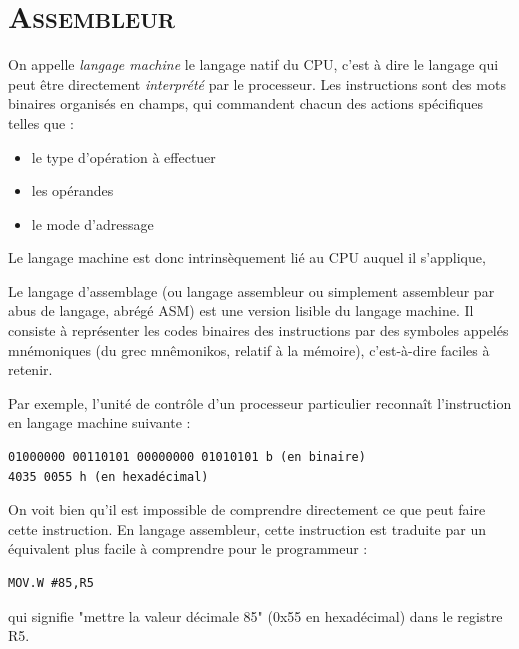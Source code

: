 \chapter{\textsc{Assembleur}}

On appelle \textit{langage machine} le langage natif du CPU, c'est à dire le langage qui peut être directement \textit{interprété} par le processeur. Les instructions sont des mots binaires organisés en champs, qui commandent chacun des actions spécifiques telles que :
\begin{itemize}[label=\textbullet,font=\small]
\item le type d'opération à effectuer
\item les opérandes
\item le mode d'adressage
\end{itemize}
Le langage machine est donc intrinsèquement lié au CPU auquel il s'applique,

Le langage d'assemblage (ou langage assembleur ou simplement assembleur par abus de
langage, abrégé ASM) est une version lisible du langage machine. Il consiste à représenter les codes binaires des instructions par des symboles appelés mnémoniques (du grec mnêmonikos, relatif à la mémoire), c'est-à-dire faciles à retenir.

Par exemple, l'unité de contrôle d'un processeur particulier reconnaît l'instruction en langage
machine suivante :


\lstset{style=customc}
\begin{lstlisting}
01000000 00110101 00000000 01010101 b (en binaire)
4035 0055 h (en hexadécimal)
\end{lstlisting}

On voit bien qu'il est impossible de comprendre directement ce que peut faire cette instruction.
En langage assembleur, cette instruction est traduite par un équivalent plus facile à comprendre
pour le programmeur :
\lstset{style=customc}
\begin{lstlisting}
MOV.W #85,R5
\end{lstlisting}

qui signifie "mettre la valeur décimale 85" (0x55 en hexadécimal) dans le registre R5.


